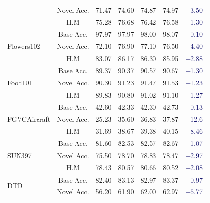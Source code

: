 \begin{table}[!t]
{\begin{tabular}{lc|cccc|c}
                           & Novel Acc.         & 71.47 & 74.60    & 74.87&74.97   &  \textcolor{MidnightBlue}{{+3.50}}\\
                               & H.M            & 75.28 & 76.68    & 76.42  &  76.58 & \textcolor{MidnightBlue}{{+1.30}}\\
\midrule
\multirow{3}{*}{Flowers102}    & Base Acc.      & 97.97 & 97.97    & 98.00  &98.07&  \textcolor{MidnightBlue}{{+0.10}}\\
                               & Novel Acc.      & 72.10 & 76.90    & 77.10 &76.50 & \textcolor{MidnightBlue}{{+4.40}}\\
                               & H.M             & 83.07 & 86.17    & 86.30  & 85.95& \textcolor{MidnightBlue}{{+2.88}}\\
\midrule
\multirow{3}{*}{Food101}       & Base Acc.       & 89.37 & 90.37    & {90.57}  &90.67&\textcolor{MidnightBlue}{{+1.30}}\\
                               & Novel Acc.      & 90.30 & 91.23    & 91.47  & 91.53&  \textcolor{MidnightBlue}{{+1.23}}\\
                               & H.M            & 89.83 & 90.80    & 91.02  & 91.10& \textcolor{MidnightBlue}{{+1.27}}\\
\midrule
\multirow{3}{*}{FGVCAircraft}  & Base Acc.       & 42.60 & 42.33    & 42.30 & 42.73  &  \textcolor{MidnightBlue}{{+0.13}}\\
                               & Novel Acc.      & 25.23 & 35.60    & 36.83 &37.87   &  \textcolor{MidnightBlue}{{+12.6}}\\
                               & H.M             & 31.69 & 38.67    & 39.38  & 40.15  &  \textcolor{MidnightBlue}{{+8.46}}\\
\midrule
\multirow{3}{*}{SUN397}        & Base Acc.      & 81.60 & 82.53    &  82.57  &82.67 &   \textcolor{MidnightBlue}{{+1.07}}\\
                               & Novel Acc.      & 75.50 & 78.70    &  78.83 &78.47  &  \textcolor{MidnightBlue}{{+2.97}}\\
                               & H.M            & 78.43 & 80.57    &  80.66 &80.52  &  \textcolor{MidnightBlue}{{+2.08}}\\
\midrule
\multirow{3}{*}{DTD}           & Base Acc.       & 82.40 & 83.13    &82.97 &83.37   &  \textcolor{MidnightBlue}{{+0.97}}\\
                               & Novel Acc.      & 56.20 & 61.90    & 62.00 &62.97  &  \textcolor{MidnightBlue}{{+6.77}}\\

\end{tabular}}
\end{table}
